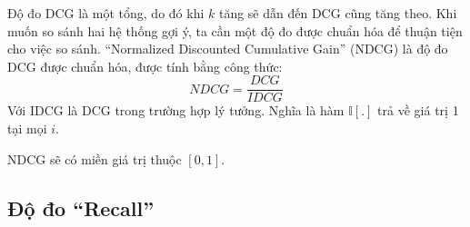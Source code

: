     Độ đo DCG là một tổng, do đó khi $k$ tăng sẽ dẫn đến DCG cũng tăng theo. Khi muốn so sánh hai hệ thống gợi ý, ta cần một độ đo được chuẩn hóa để thuận tiện cho việc so sánh. ``Normalized Discounted Cumulative Gain'' (NDCG) là độ đo DCG được chuẩn hóa, được tính bằng công thức:
    \begin{equation}
        NDCG = \frac{DCG}{IDCG}
    \end{equation}
    Với IDCG là DCG trong trường hợp lý tưởng. Nghĩa là hàm $\mathbb{I}[.]$ trả về giá trị 1 tại mọi $i$.

    NDCG sẽ có miền giá trị thuộc $[0, 1]$.

\subsection{Độ đo ``Recall''}
    


